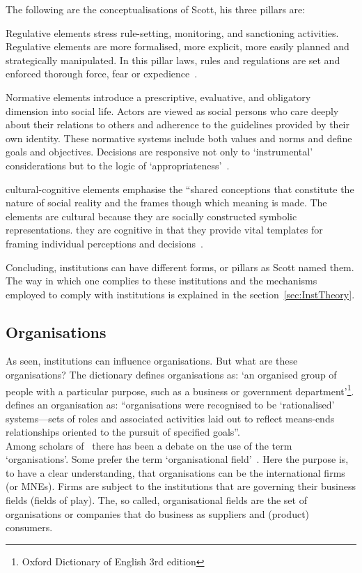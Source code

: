 The following are the conceptualisations of Scott, his three pillars are:
\begin{description}\label{desc:pillars}
\item [regulative] Regulative elements stress rule-setting, monitoring, and sanctioning activities. 
 Regulative elements are more formalised, more explicit, more easily planned and strategically manipulated. 
 In this pillar laws, rules and regulations are set and enforced thorough force, fear or expedience~\citep{Scott:2005us,Scott:2010us,Scott:2008tk}.
\item [normative] Normative elements introduce a prescriptive, evaluative, and obligatory dimension into social life.
Actors are viewed as social persons who care deeply about their relations to others and adherence to the guidelines provided by their own identity. 
These normative systems include both values and norms and define goals and objectives. 
Decisions are responsive not only to `instrumental’ considerations but to the logic of `appropriateness’~\citep{Scott:2005us,Scott:2010us,Scott:2008tk}.
\item [cultural-cognitive] cultural-cognitive elements emphasise the “shared conceptions that constitute the nature of social reality and the frames though which meaning is made.
The elements are cultural because they are socially constructed symbolic representations.
they are cognitive in that they provide vital templates for framing individual perceptions and decisions~\citep{Scott:2005us,Scott:2010us,Scott:2008tk}.
\end{description}

Concluding, institutions can have different forms, or pillars as Scott named them. 
The way in which one complies to these institutions and the mechanisms employed to comply with institutions is explained in the section~\ref{sec:InstTheory}.

\subsection{Organisations} 

As seen, institutions can influence organisations. 
But what are these organisations?
The dictionary defines organisations as: `an organised group of people with a particular purpose, such as a business or government department'\footnote{Oxford Dictionary of English 3rd edition}. 
\citep[p.14]{Scott:2005us} defines an organisation as: ``organisations were recognised to be `rationalised' systems—sets of roles and associated activities laid out to reflect means-ends relationships oriented to the pursuit of specified goals''.\\
Among scholars of \inth~there has been a debate on the use of the term `organisations'. 
Some prefer the term `organisational field'~\citep{DiMaggio:1983wt,Westney:2005vv}.
Here the purpose is, to have a clear understanding, that organisations can be the international firms (or \glspl{MNE}).
Firms are subject to the institutions that are governing their business fields (fields of play).
The, so called, organisational fields are the set of organisations or companies that do business as suppliers and (product) consumers.



